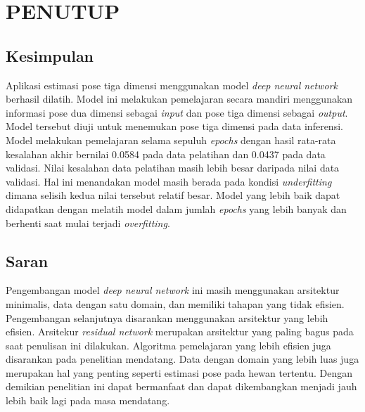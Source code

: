 
\chapter{PENUTUP}
\label{cha:5-PENUTUP}

\section{Kesimpulan}
\label{sec:5-Kesimpulan}

Aplikasi estimasi pose tiga dimensi menggunakan model \textit{deep neural network} berhasil dilatih.
Model ini melakukan pemelajaran secara mandiri menggunakan informasi pose dua dimensi sebagai \textit{input}
dan pose tiga dimensi sebagai \textit{output}.
Model tersebut diuji untuk menemukan pose tiga dimensi pada data inferensi. Model melakukan pemelajaran
selama sepuluh \textit{epochs} dengan hasil rata-rata kesalahan akhir bernilai 0.0584 pada data pelatihan
dan 0.0437 pada data validasi. Nilai kesalahan data pelatihan masih lebih besar daripada nilai data validasi.
Hal ini menandakan model masih berada pada kondisi \textit{underfitting} dimana selisih kedua nilai tersebut relatif
besar. Model yang lebih baik dapat didapatkan dengan melatih model dalam jumlah \textit{epochs} yang
lebih banyak dan berhenti saat mulai terjadi \textit{overfitting}.

\section{Saran}
\label{sec:5-Saran}

Pengembangan model \textit{deep neural network} ini masih menggunakan arsitektur minimalis, data dengan
satu domain, dan memiliki tahapan yang tidak efisien. Pengembangan selanjutnya disarankan menggunakan
arsitektur yang lebih efisien. Arsitekur \textit{residual network} merupakan arsitektur yang paling
bagus pada saat penulisan ini dilakukan. Algoritma pemelajaran yang lebih efisien juga disarankan
pada penelitian mendatang. Data dengan domain yang lebih luas juga merupakan hal yang penting seperti
estimasi pose pada hewan tertentu. Dengan demikian penelitian ini dapat bermanfaat dan dapat dikembangkan
menjadi jauh lebih baik lagi pada masa mendatang.